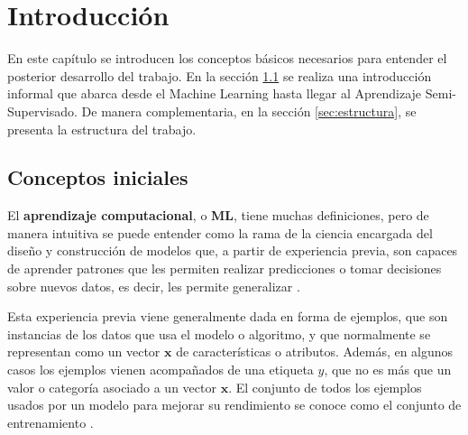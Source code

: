 \chapter{Introducción}

En este capítulo se introducen los conceptos básicos necesarios para entender el posterior desarrollo del trabajo. En la sección \ref{sec:introduccion} se realiza una introducción informal que abarca desde el Machine Learning hasta llegar al Aprendizaje Semi-Supervisado. De manera complementaria, en la sección \ref{sec:estructura}, se presenta la estructura del trabajo. 

\section{Conceptos iniciales}
\label{sec:introduccion}

El \textbf{aprendizaje computacional}, o \textbf{\gls{ML}}, tiene muchas definiciones, pero de manera intuitiva se puede entender como la rama de la ciencia encargada del diseño y construcción de modelos que, a partir de experiencia previa, son capaces de aprender patrones que les permiten realizar predicciones o tomar decisiones sobre nuevos datos, es decir, les permite generalizar \cite{mohri2018foundations}.

Esta experiencia previa viene generalmente dada en forma de ejemplos, que son instancias de los datos que usa el modelo o algoritmo, y que normalmente se representan como un vector $\mathbf{x}$ de características o atributos. Además, en algunos casos los ejemplos vienen acompañados de una etiqueta $y$, que no es más que un valor o categoría asociado a un vector $\mathbf{x}$. El conjunto de todos los ejemplos usados por un modelo para mejorar su rendimiento se conoce como el conjunto de entrenamiento \cite{mohri2018foundations}. 

